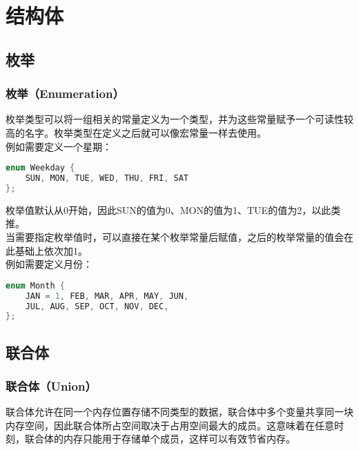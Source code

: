 \chapter{结构体}

\section{枚举}

\subsection{枚举（Enumeration）}

枚举类型可以将一组相关的常量定义为一个类型，并为这些常量赋予一个可读性较高的名字。枚举类型在定义之后就可以像宏常量一样去使用。\\

例如需要定义一个星期：

\vspace{-0.5cm}

\begin{lstlisting}[language=C++]
enum Weekday {
    SUN, MON, TUE, WED, THU, FRI, SAT
};
\end{lstlisting}

枚举值默认从0开始，因此SUN的值为0、MON的值为1、TUE的值为2，以此类推。\\

当需要指定枚举值时，可以直接在某个枚举常量后赋值，之后的枚举常量的值会在此基础上依次加1。\\

例如需要定义月份：

\vspace{-0.5cm}

\begin{lstlisting}[language=C++]
enum Month {
    JAN = 1, FEB, MAR, APR, MAY, JUN,
    JUL, AUG, SEP, OCT, NOV, DEC,
};
\end{lstlisting}

\newpage

\section{联合体}

\subsection{联合体（Union）}

联合体允许在同一个内存位置存储不同类型的数据，联合体中多个变量共享同一块内存空间，因此联合体所占空间取决于占用空间最大的成员。这意味着在任意时刻，联合体的内存只能用于存储单个成员，这样可以有效节省内存。\\

